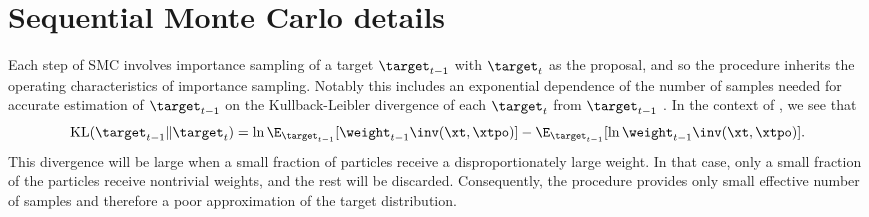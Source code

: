 \section{Sequential Monte Carlo details}\label{sec:SMC_details}







Each step of SMC involves importance sampling of a target $\target_{t-1}$ with $\target_t$ as the proposal, and so the procedure inherits the operating characteristics of importance sampling. Notably this includes an exponential dependence of the number of samples needed for accurate estimation of $\target_{t-1}$ on the Kullback-Leibler divergence of each $\target_t$ from $\target_{t-1}$ \citep{chatterjee2018sample}. In the context of  , we see that $$\mathrm{KL}(\target_{t-1} \| \target_t)=\ln \E_{\target_{t-1}}[\weight_{t-1}\inv(\xt, \xtpo)] - \E_{\target_{t-1}}[\ln \weight_{t-1}\inv(\xt, \xtpo)].$$ This divergence will be large when a small fraction of particles receive a disproportionately large weight.
In that case, only a small fraction of the particles receive nontrivial weights, and the rest will be discarded. Consequently, the procedure provides only small effective number of samples and therefore a poor approximation of the target distribution. 




